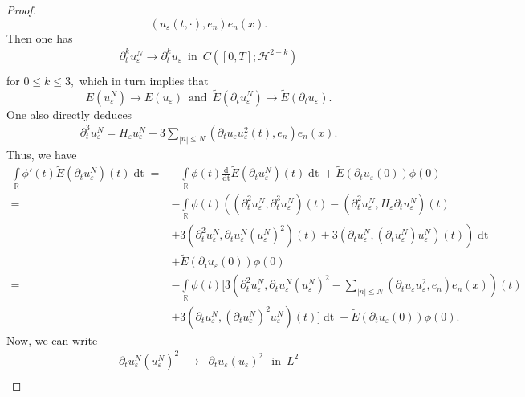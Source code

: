 \documentclass[11pt, oneside]{article}   	%
\newcommand{\cdummy}{\cdot}
\newcommand{\mathd}{\mathrm{d}}
\newcommand{\tmop}[1]{\ensuremath{\operatorname{#1}}}
\newcommand{\ssp}{\mathscr{H}}
\begin{document}
\begin{proof}
\[	(u_{\varepsilon} (t, \cdummy), e_n) e_n (x) . \]
	Then one has
	\begin{align*}
	\partial_t^{k}u^N_{\varepsilon}  \rightarrow  \partial^k_tu_{\varepsilon} \ \tmop{in} \ C([0,T];\ssp^{2-k})\\
\end{align*}
	for $0\le k\le 3,$
	which in turn implies that
	\[ E (u^N_{\varepsilon}) \rightarrow E (u_{\varepsilon}) \ \tmop{and}\ 
	\tilde{E} (\partial_t u^N_{\varepsilon}) \rightarrow \tilde{E}
	(\partial_t u_{\varepsilon}) . \]
	One also directly deduces
	\begin{align*}
	\partial^3_t u^N_{\varepsilon}  = H_{\varepsilon} u^N_{\varepsilon} - 3 \underset{| n | \le
		N}{\sum} (\partial_t u_{\varepsilon} u^2_{\varepsilon} (t), e_n) e_n (x) .
	\end{align*}
	Thus, we have 
	\begin{align}
	\underset{\mathbb{R}}{\int} \phi' (t) \tilde{E} (\partial_t
	u^N_{\varepsilon}) (t) \tmop{dt}  =&  - \underset{\mathbb{R}}{\int} \phi
	(t) \frac{\mathd}{\tmop{dt}} \tilde{E} (\partial_t u^N_{\varepsilon}) (t)
	\tmop{dt} +\tilde{E}(\partial_tu_\varepsilon(0))\phi(0)\nonumber\\
	=&  - \underset{\mathbb{R}}{\int} \phi (t) \left( (\partial^2_t
	u^N_{\varepsilon}, \partial^3_t u^N_{\varepsilon}) (t) - (\partial^2_t 
	u^N_{\varepsilon}, H_{\varepsilon} \partial_t u^N_{\varepsilon}) (t)\right.\nonumber\\
	& \left.  + 3
	\left( \partial^2_t u^N_{\varepsilon}, \partial_t u^N_{\varepsilon}
	(u^N_{\varepsilon})^2 \right) (t) + 3 (\partial_t u^N_{\varepsilon},
	(\partial_t u^N_{\varepsilon}) u^N_{\varepsilon}) (t) \right) \tmop{dt} \\
	&+\tilde{E}(\partial_tu_\varepsilon(0))\phi(0)\nonumber\\
	=&  - \underset{\mathbb{R}}{\int} \phi (t) [ 3 (
	\partial^2_t u^N_{\varepsilon}, \partial_t u^N_{\varepsilon}
	(u^N_{\varepsilon})^2 - \underset{| n | \le N}{\sum} (\partial_t
	u_{\varepsilon} u^2_{\varepsilon}, e_n) e_n (x) ) (t) \nonumber\\  &+  3
	(\partial_t u^N_{\varepsilon}, (\partial_t u^N_{\varepsilon})^2
	u^N_{\varepsilon}) (t) ] \tmop{dt} +\tilde{E}(\partial_tu_\varepsilon(0))\phi(0). \hspace{3em}
	\label{eqn:dtenergyN}
	\end{align}
	Now,  we can write
	\begin{eqnarray*}
		\partial_t u^N_{\varepsilon} (u^N_{\varepsilon})^2 & \rightarrow &
		\partial_t u_{\varepsilon} (u_{\varepsilon})^2\  \ \tmop{in} \  L^2\\

\end{eqnarray*}
\end{proof}
\end{document}
